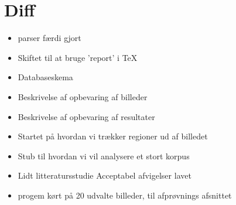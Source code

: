 {
\section*{Diff}
\begin{itemize}
	\item parser færdi gjort
    \item Skiftet til at bruge 'report' i \TeX{}
    \item Databaseskema
    \item Beskrivelse af opbevaring af billeder
    \item Beskrivelse af opbevaring af resultater
    \item Startet på hvordan vi trækker regioner ud af billedet
    \item Stub til hvordan vi vil analysere et stort korpus
	\item Lidt litteratursstudie
	\itme Acceptabel afvigelser lavet
	\item progem kørt på 20 udvalte billeder, til afprøvnings afsnittet 
\end{itemize}

}

